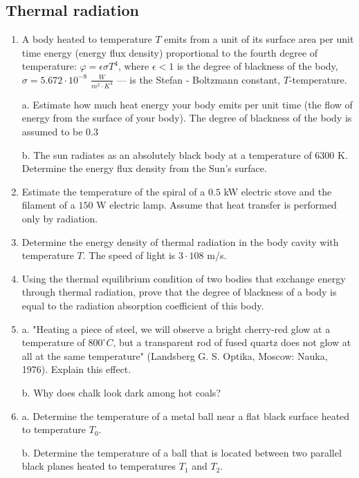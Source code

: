 \documentclass{article}
\begin{document}
\subsection{Thermal radiation}

\begin{enumerate}[label=5.11.\arabic*]

\item A body heated to temperature $T$ emits from a unit of its surface area per unit time energy (energy flux density) proportional to the fourth degree of temperature: $\varphi = \epsilon \sigma T^4$, where $\epsilon < 1$ is the degree of blackness of the body, $\sigma = 5.672 \cdot 10^{-8}$ $\frac{W}{m^2 \cdot K^4}$ — is the Stefan - Boltzmann constant, $T$-temperature.

a. Estimate how much heat energy your body emits per unit time (the flow of energy from the surface of your body). The degree of blackness of the body is assumed to be $0.3$

b. The sun radiates as an absolutely black body at a temperature of $6300$ K. Determine the energy flux density from the Sun's surface.

\item Estimate the temperature of the spiral of a $0.5$ kW electric stove and the filament of a $150$ W electric lamp. Assume that heat transfer is performed only by radiation.

\item Determine the energy density of thermal radiation in the body cavity with temperature $T$. The speed of light is $3 \cdot 108$ m/s.

\item Using the thermal equilibrium condition of two bodies that exchange energy through thermal radiation, prove that the degree of blackness of a body is equal to the radiation absorption coefficient of this body.

\item a. "Heating a piece of steel, we will observe a bright cherry-red glow at a temperature of $800^\circ C$, but a transparent rod of fused quartz does not glow at all at the same temperature" (Landsberg G. S. Optika, Moscow: Nauka, 1976). Explain this effect. 

b. Why does chalk look dark among hot coals?

\item a. Determine the temperature of a metal ball near a flat black surface heated to temperature $T_0$. 

b. Determine the temperature of a ball that is located between two parallel black planes heated to temperatures $T_1$ and $T_2$.


\end{enumerate}
\end{document}
